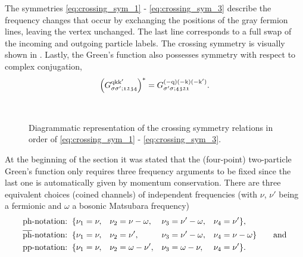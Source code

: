 \documentclass[../../main.tex]{subfiles}
\begin{document}
The symmetries \eqref{eq:crossing_sym_1} - \eqref{eq:crossing_sym_3} describe the frequency changes that occur by exchanging the positions of the gray fermion lines, leaving the vertex unchanged. The last line corresponds to a full swap of the incoming and outgoing particle labels. The crossing symmetry is visually shown in . Lastly, the Green's function also possesses symmetry with respect to complex conjugation,
\begin{align}
	\left (G_{\sigma\sigma';\mathfrak{1234}}^{\text{q}\text{k}\text{k}'}\right )^*=G_{\sigma'\sigma;\mathfrak{4321}}^{(-\text{q})(-\text{k})(-\text{k}')}.
\end{align}
\begin{figure}[h]
  \centering
  \vspace{0.5cm}\\
  \caption{Diagrammatic representation of the crossing symmetry relations in order of \eqref{eq:crossing_sym_1} - \eqref{eq:crossing_sym_3}.}
  \label{fig:two_particle_green_crossing_symmetry}
\end{figure}
At the beginning of the section it was stated that the (four-point) two-particle Green's function only requires three frequency arguments to be fixed since the last one is automatically given by momentum conservation. There are three equivalent choices (coined channels) of independent frequencies (with $\nu$, $\nu'$ being a fermionic and $\omega$ a bosonic Matsubara frequency)
\begin{subequations}
\begin{align}
	\text{ph-notation:}&\;\;\{\nu_1=\nu,&&\nu_2=\nu-\omega,&&\nu_3=\nu'-\omega,&&\nu_4=\nu'\},\label{eq:ph_freq}\\
	\overline{\text{ph}}\text{-notation:}&\;\;\{\nu_1=\nu,&&\nu_2=\nu',&&\nu_3=\nu'-\omega,&&\nu_4=\nu-\omega\}\qquad\text{and}\label{eq:ph_bar_freq}\\
	\text{pp-notation:}&\;\;\{\nu_1=\nu,&&\nu_2=\omega-\nu',&&\nu_3=\omega-\nu,&&\nu_4=\nu'\}.\label{eq:pp_freq}
\end{align}
\end{subequations}
\end{document}
